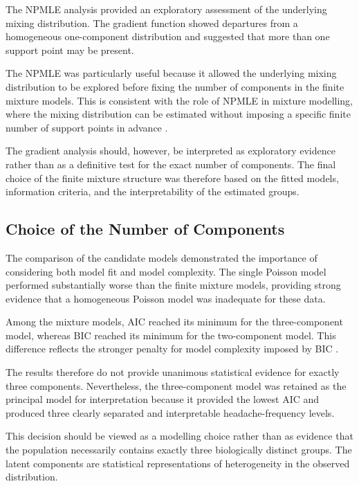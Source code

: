 The NPMLE analysis provided an exploratory assessment of the
underlying mixing distribution. The gradient function showed
departures from a homogeneous one-component distribution and
suggested that more than one support point may be present.

The NPMLE was particularly useful because it allowed the underlying
mixing distribution to be explored before fixing the number of
components in the finite mixture models. This is consistent with the
role of NPMLE in mixture modelling, where the mixing distribution can
be estimated without imposing a specific finite number of support
points in advance \citep{Lindsay1983,Lindsay1983b}.

The gradient analysis should, however, be interpreted as exploratory
evidence rather than as a definitive test for the exact number of
components. The final choice of the finite mixture structure was
therefore based on the fitted models, information criteria, and the
interpretability of the estimated groups.

\subsection{Choice of the Number of Components}

The comparison of the candidate models demonstrated the importance
of considering both model fit and model complexity. The single
Poisson model performed substantially worse than the finite mixture
models, providing strong evidence that a homogeneous Poisson model
was inadequate for these data.

Among the mixture models, AIC reached its minimum for the
three-component model, whereas BIC reached its minimum for the
two-component model. This difference reflects the stronger penalty
for model complexity imposed by BIC \citep{Akaike1974,Schwarz1978}.

The results therefore do not provide unanimous statistical evidence
for exactly three components. Nevertheless, the three-component
model was retained as the principal model for interpretation because
it provided the lowest AIC and produced three clearly separated and
interpretable headache-frequency levels.

This decision should be viewed as a modelling choice rather than as
evidence that the population necessarily contains exactly three
biologically distinct groups. The latent components are statistical
representations of heterogeneity in the observed distribution.

